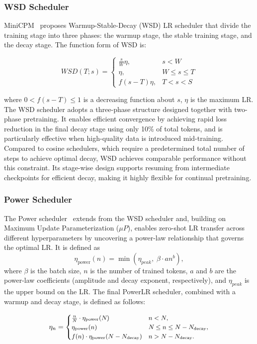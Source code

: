 \subsubsection{WSD Scheduler}
MiniCPM~\cite{hu2024minicpm} proposes Warmup-Stable-Decay (WSD) LR scheduler that divide the training stage into three phases: the warmup stage, the stable training stage, and the decay stage. The function form of WSD is:

\[
WSD(T; s) = 
\begin{cases}
\frac{s}{W} \eta, & s < W \\
\eta, & W \leq s \leq T \\
f(s - T)\eta, & T < s < S
\end{cases}
\]

where $0<f(s-T)\leq1$ is a decreasing function about $s$, $\eta$ is the maximum LR. The WSD scheduler adopts a three-phase structure designed together with two-phase pretraining. It enables efficient convergence by achieving rapid loss reduction in the final decay stage using only 10\% of total tokens, and is particularly effective when high-quality data is introduced mid-training. Compared to cosine schedulers, which require a predetermined total number of steps to achieve optimal decay, WSD achieves comparable performance without this constraint. Its stage-wise design supports resuming from intermediate checkpoints for efficient decay, making it highly flexible for continual pretraining.


\subsubsection{Power Scheduler}

The Power scheduler~\cite{shen2024power} extends from the WSD scheduler and, building on Maximum Update Parameterization ($\mu P$), enables zero-shot LR transfer across different hyperparameters by uncovering a power-law relationship that governs the optimal LR. It is defined as
\begin{equation}
\eta_{\text{power}}(n) = \min\left(\eta_{peak},\; \beta \cdot a n^b\right),
\end{equation}
where $\beta$ is the batch size, $n$ is the number of trained tokens, $a$ and $b$ are the power-law coefficients (amplitude and decay exponent, respectively), and $\eta_{peak}$ is the upper bound on the LR. The final PowerLR scheduler, combined with a warmup and decay stage, is defined as follows:

\begin{equation}
\small
\eta_n = 
\begin{cases}
\frac{n}{N_{\text{}}} \cdot \eta_{\text{power}}(N_{\text{}}) & n < N_{\text{}}, \\
\eta_{\text{power}}(n) & N_{\text{}} \leq n \leq N - N_{\text{decay}}, \\
f(n) \cdot \eta_{\text{power}}(N - N_{\text{decay}}) & n > N - N_{\text{decay}}.
\end{cases}
\label{eq:power}
\end{equation}

